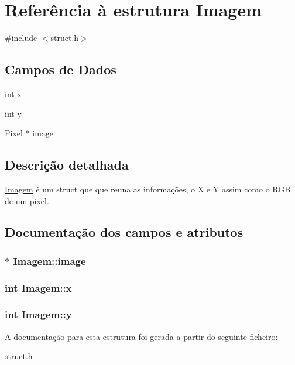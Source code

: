 \hypertarget{structImagem}{}\section{Referência à estrutura Imagem}
\label{structImagem}


{\ttfamily \#include $<$struct.\+h$>$}

\subsection*{Campos de Dados}
\begin{DoxyCompactItemize}
\item 
int \hyperlink{structImagem_ad9c4480f6e85a478424c540e9ed5d69d}{x}
\item 
int \hyperlink{structImagem_aaadb35846686b4f7f66d589d929ca57a}{y}
\item 
\hyperlink{structPixel}{Pixel} $\ast$ \hyperlink{structImagem_a4d2467ff2a3b781f9ef1197589859d30}{image}
\end{DoxyCompactItemize}


\subsection{Descrição detalhada}
\hyperlink{structImagem}{Imagem} é um struct que que reuna as informações, o X e Y assim como o R\+G\+B de um pixel. 

\subsection{Documentação dos campos e atributos}
\hypertarget{structImagem_a4d2467ff2a3b781f9ef1197589859d30}{}
\subsubsection[{image}]{$\ast$ Imagem\+::image}\label{structImagem_a4d2467ff2a3b781f9ef1197589859d30}
\hypertarget{structImagem_ad9c4480f6e85a478424c540e9ed5d69d}{}
\subsubsection[{x}]{\setlength{\rightskip}{0pt plus 5cm}int Imagem\+::x}\label{structImagem_ad9c4480f6e85a478424c540e9ed5d69d}
\hypertarget{structImagem_aaadb35846686b4f7f66d589d929ca57a}{}
\subsubsection[{y}]{\setlength{\rightskip}{0pt plus 5cm}int Imagem\+::y}\label{structImagem_aaadb35846686b4f7f66d589d929ca57a}


A documentação para esta estrutura foi gerada a partir do seguinte ficheiro\+:\begin{DoxyCompactItemize}
\item 
\hyperlink{struct_8h}{struct.\+h}\end{DoxyCompactItemize}

